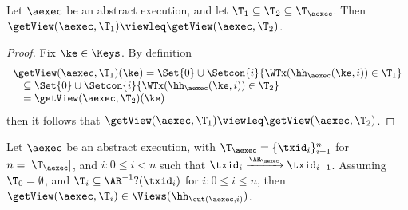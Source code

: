 \begin{lemma}
\label{lem:getView.monotone}
Let $\aexec$ be an abstract execution, and let $\T_1 \subseteq \T_2 \subseteq \T_{\aexec}$. 
Then $\getView(\aexec, \T_1) \viewleq \getView(\aexec, \T_2)$.
\end{lemma}
\begin{proof}
Fix $\ke \in \Keys$. By definition  
\[
\begin{array}{l}
    \getView(\aexec, \T_1)(\ke) = \Set{0} \cup \Setcon{ i }{\WTx(\hh_{\aexec}(\ke, i)) \in \T_1} \\
    \quad \subseteq \Set{0} \cup \Setcon{i }{ \WTx(\hh_{\aexec}(\ke, i)) \in \T_2} \\
\quad = \getView(\aexec, \T_2)(\ke)
\end{array}
\]
then it follows that  $\getView(\aexec, \T_1) \viewleq \getView(\aexec, \T_2)$.
\end{proof}

\begin{lemma}
\label{lem:cut.views}
Let $\aexec$ be an abstract execution, with $\T_{\aexec} = \{\txid_{i}\}_{i = 1}^{n}$ for 
$n = \lvert \T_{\aexec} \rvert$, and \( i : 0 \leq i < n\) such that $\txid_{i} \xrightarrow{\AR_{\aexec}} \txid_{i+1}$.
Assuming $\T_{0} = \emptyset$, and $\T_{i} \subseteq \AR^{-1}?(\txid_{i})$ for $i : 0 \leq i \leq n$,
then $\getView(\aexec, \T_{i}) \in \Views(\hh_{\cut(\aexec, i)})$.
\end{lemma}

